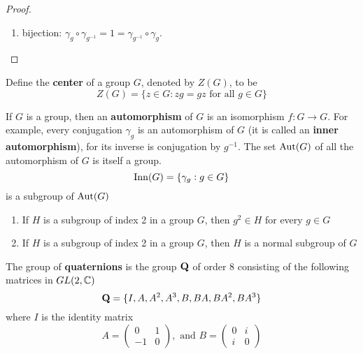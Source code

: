 \documentclass[11pt]{article}
\begin{document}
\begin{proof}
\begin{enumerate}
\item bijection: \(\gamma_g\circ\gamma_{g^{-1}}=1=\gamma_{g^{-1}}\circ\gamma_g\).
\end{enumerate}
\end{proof}

\begin{examplle}[]
Define the \textbf{center} of a group \(G\), denoted by \(Z(G)\), to be
\begin{equation*}
Z(G)=\{z\in G:zg=gz\text{ for all }g\in G\}
\end{equation*}
\end{examplle}

\begin{examplle}[]
If \(G\) is a group, then an \textbf{automorphism} of \(G\) is an isomorphism \(f:G\to G\).
For example, every conjugation \(\gamma_g\) is an automorphism of \(G\) (it is
called an \textbf{inner automorphism}), for its inverse is conjugation by \(g^{-1}\).
The set \(\operatorname{Aut}(G)\) of all the automorphism of \(G\) is itself a group.
\begin{equation*}
\operatorname{Inn}(G)=\{\gamma_g:g\in G\}
\end{equation*}
is a subgroup of \(\operatorname{Aut}(G)\)
\end{examplle}
\begin{proposition}[]
\begin{enumerate}
\item If \(H\) is a subgroup of index 2 in a group \(G\), then \(g^2\in H\) for every
\(g\in G\)
\item If \(H\) is a subgroup of index 2 in a group \(G\), then \(H\) is a normal
subgroup of \(G\)
\end{enumerate}
\end{proposition}


\begin{definition}[]
The group of \textbf{quaternions} is the group \(\operatorname{\textbf{Q}}\) of order 8 consisting of the
following matrices in \(GL(2, \mathbb{C})\)
\begin{equation*}
\operatorname{\textbf{Q}}=\{I,A,A^2,A^3,B,BA,BA^2,BA^3\}
\end{equation*}
where \(I\) is the identity matrix
\begin{equation*}
A=
\begin{pmatrix}
0&1\\
-1&0
\end{pmatrix}, \text{ and }
B=\begin{pmatrix}
0&i\\
i&0
  \end{pmatrix}
\end{equation*}
\end{definition}
\end{document}
